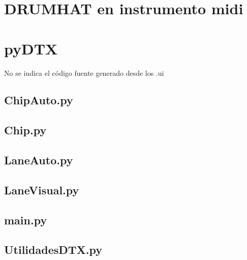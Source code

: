 \documentclass[a4paper,11pt,oneside]{book}
\begin{document}


\section{DRUMHAT en instrumento midi}


\section{pyDTX}

No se indica el código fuente generado desde los .ui

\subsection{ChipAuto.py}



\subsection{Chip.py}



\subsection{LaneAuto.py}



\subsection{LaneVisual.py}



\subsection{main.py}



\subsection{UtilidadesDTX.py}
\end{document}

